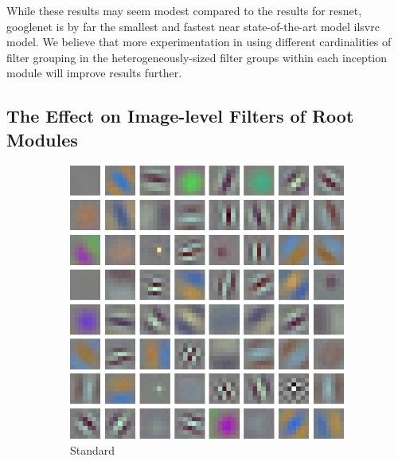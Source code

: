 \documentclass[thesis]{subfiles}
\begin{document}
	While these results may seem modest compared to the results for \gls{resnet}, \gls{googlenet} is by far the smallest and fastest near state-of-the-art model \gls{ilsvrc} model. We believe that more experimentation in using different cardinalities of filter grouping in the heterogeneously-sized filter groups within each \gls{inception} module will improve results further.
	
	\subsection{The Effect on Image-level Filters of Root Modules}
	\begin{figure}[tb]
		\centering
		\begin{subfigure}[b]{0.45\textwidth}
			\centering
			\includegraphics[width=\textwidth]{Figs/Raster/msrc-resnet-50-conv1}
			\caption{Standard}
			\label{fig:resnet50normalconv0}
		\end{subfigure}
		~
		\begin{subfigure}[b]{0.45\textwidth}
			\centering

\end{subfigure}
\end{figure}
\end{document}
